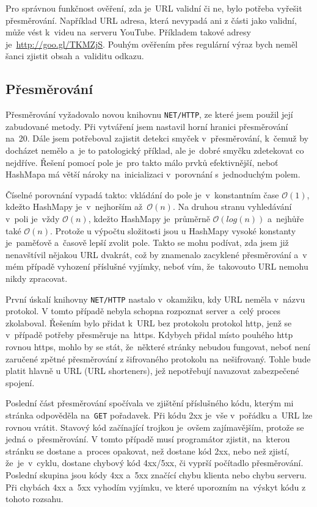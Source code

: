 \par Pro správnou funkčnost ověření, zda je~URL validní či ne, bylo potřeba vyřešit přesměrování. Například URL adresa, která nevypadá ani z části jako validní, může vést k~videu na~serveru YouTube. Příkladem takové adresy je~\url{http://goo.gl/TKMZjS}. Pouhým ověřením přes regulární výraz bych neměl šanci zjistit obsah a~validitu odkazu. 

\subsection{Přesměrování}
\par Přesměrování\cite{nethttp} vyžadovalo novou knihovnu \texttt{NET/HTTP}, ze které jsem použil její zabudované metody. Při vytváření jsem nastavil horní hranici přesměrování na~20. Dále jsem potřeboval zajistit detekci smyček v~přesměrování, k~čemuž by docházet nemělo a~je to patologický příklad, ale je~dobré smyčku zdetekovat co nejdříve. Řešení pomocí pole je~pro takto málo prvků efektivnější, neboť HashMapa má větší nároky na~inicializaci v~porovnání s~jednoduchým polem. 
\par Číselné porovnání vypadá takto: vkládání do pole je~v~konstantním čase $\mathcal{O}(1)$, kdežto HashMapy je~v~nejhorším až~$\mathcal{O}(n)$. Na druhou stranu vyhledávání v~poli je~vždy $\mathcal{O}(n)$, kdežto HashMapy je~průměrně $\mathcal{O}(log(n))$ a~nejhůře také $\mathcal{O}(n)$. Protože u výpočtu složitosti jsou u HashMapy vysoké konstanty je~paměťově a~časově lepší zvolit pole. Takto se mohu podívat, zda jsem již nenavštívil nějakou URL dvakrát, což by znamenalo zacyklené přesměrování a~v mém případě vyhození příslušné vyjímky, neboť vím, že~takovouto URL nemohu nikdy zpracovat.

\par První úskalí knihovny \texttt{NET/HTTP}\cite{nethttp} nastalo v~okamžiku, kdy URL neměla v~názvu protokol. V tomto případě nebyla schopna rozpoznat server a~celý proces zkolaboval. Řešením bylo přidat k~URL bez protokolu protokol http, jenž se v~případě potřeby přesměruje na~https. Kdybych přidal místo pouhého http rovnou https, mohlo by se stát, že~některé stránky nebudou fungovat, neboť není zaručené zpětné přesměrování z šifrovaného protokolu na~nešifrovaný. Tohle bude platit hlavně u  URL (URL shorteners), jež nepotřebují navazovat zabezpečené spojení. 
\par Poslední část přesměrování spočívala ve zjištění příslušného kódu, kterým mi stránka odpověděla na~\texttt{GET} pořadavek. Při kódu 2xx je~vše v~pořádku a~URL lze rovnou vrátit. Stavový kód začínající trojkou je~ovšem zajímavějším, protože se jedná o~přesměrování. V tomto případě musí programátor zjistit, na~kterou stránku se dostane a~proces opakovat, než dostane kód 2xx, nebo než zjistí, že~je~v~cyklu, dostane chybový kód 4xx/5xx, či vyprší počítadlo přesměrování. Poslední skupina jsou kódy 4xx a~5xx značící chybu klienta nebo chybu serveru. Při chybách 4xx a~5xx vyhodím vyjímku, ve které uporozním na~výskyt kódu z tohoto rozsahu.


